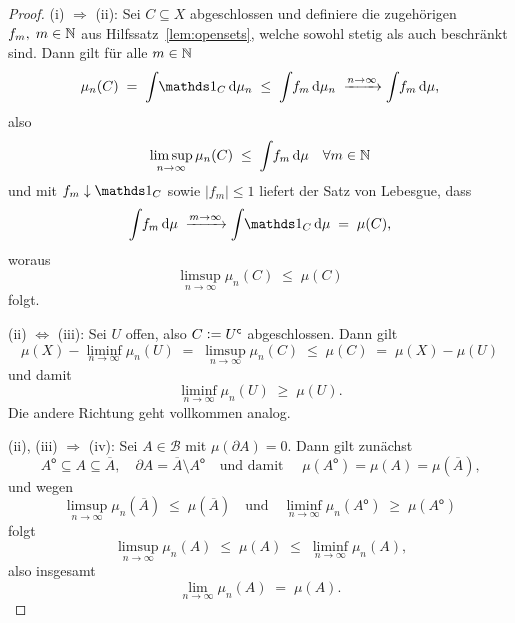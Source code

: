 \documentclass[../main/main.tex]{subfiles}
\begin{document}
	\begin{proof}
		(i) $\Rightarrow$ (ii): Sei $C \subseteq X$ abgeschlossen und definiere 
		die zugehörigen $f_m, \; m \in \mathbb{N}$ aus Hilfssatz~\ref{lem:opensets}, 
		welche sowohl stetig als auch beschränkt sind.
		Dann gilt für alle $m \in \mathbb{N}$
		$$\mu_n(C) \; = \; \measureint{}{\indfct_C}{\mu_n} \; \leq \; 
			\measureint{}{f_m}{\mu_n} \; \xrightarrow{n \to \infty} 
			\measureint{}{f_m}{\mu} \text{,}$$
		also 
		$$\limsup_{n \to \infty} \mu_n(C) \; \leq \; 
			\int_{} \, f_m \, \mathrm{d}\mu \quad \forall m \in \mathbb{N}$$
		und mit $f_m \convdown \indfct_C$ sowie $| f_m | \leq 1$ 
		liefert der Satz von Lebesgue, dass
		$$\measureint{}{f_m}{\mu} \; \xrightarrow{m \to \infty} 
			\measureint{}{\indfct_C}{\mu} \; = \; \mu(C) \text{,}$$
		woraus
		$$\limsup_{n \to \infty} \mu_n(C) \; \leq \; \mu(C)$$
		folgt.
		
		(ii) $\Leftrightarrow$ (iii): Sei $U$ offen, also 
		$C \vcentcolon = U^\mathsf{c}$ abgeschlossen. Dann gilt
		$$\mu(X) - \liminf_{n \to \infty} \mu_n(U) \; = \; 
			\limsup_{n \to \infty} \mu_n(C) \; \leq \; 
			\mu(C) \; = \; \mu(X) - \mu(U)$$
		und damit 
		$$\liminf_{n \to \infty} \mu_n(U) \; \geq \; \mu(U) \text{.}$$
		Die andere Richtung geht vollkommen analog.
		
		(ii), (iii) $\Rightarrow$ (iv): Sei $A \in \mathcal{B}$ mit 
		$\mu(\partial A) = 0$. Dann gilt zunächst
		$$A^\mathsf{o} \subseteq A \subseteq \overline{A}, \quad 
			\partial A = \overline{A} \setminus A^\mathsf{o} \quad 
			\text{und damit } \quad \mu(A^\mathsf{o}) = 
			\mu(A) = \mu(\overline{A}) \text{,}$$
		und wegen 
		$$\limsup_{n \to \infty} \mu_n(\overline{A}) \; \leq \; 
			\mu(\overline{A}) \quad \text{und} \quad 
			\liminf_{n \to \infty} \mu_n(A^\mathsf{o}) \; \geq \; 
			\mu(A^\mathsf{o})$$
		folgt
		$$\limsup_{n \to \infty} \mu_n(A) \; \leq \; 
		\mu(A) \; \leq \; \liminf_{n \to \infty} \mu_n(A) \text{,}$$
		also insgesamt
		$$\lim_{n \to \infty} \mu_n(A) \; = \; \mu(A) \text{.}$$
		

\end{proof}
\end{document}
